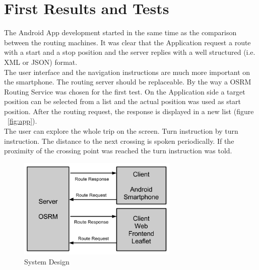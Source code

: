 \documentclass{sig-alternate}
\begin{document}
\section{First Results and Tests}
The Android App development started in the same time as the comparison between the routing machines. It was clear that the Application request a route with a start and a stop position and the server replies with a well structured (i.e. XML or JSON) format. \\
The user interface and the navigation instructions are much more important on the smartphone. The routing server should be replaceable. 
By the way a OSRM Routing Service was chosen for the first test. On the Application side a target position can be selected from a list and the actual position was used as start position. After the routing request, the response is displayed in a new list (figure ~\ref{fig:app}). \\
The user can explore the whole trip on the screen. Turn instruction by turn instruction. The distance to the next crossing is spoken periodically. If the proximity of the crossing point was reached the turn instruction was told. \\


 

\begin{figure}
\centering
\includegraphics[width=3in]{System-Design2.png}
\caption{System Design}
\end{figure}
\end{document}
